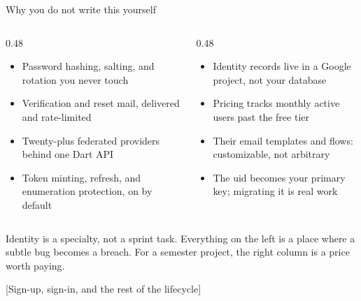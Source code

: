 \documentclass[10pt,aspectratio=169,t]{beamer}
\begin{document}
\begin{frame}[eyebrow=Fundamentals]{Why you do not write this yourself}
  \vskip 2mm
  \begin{columns}[T]
    \begin{column}{0.48\textwidth}
      \begin{itemize}
        \item Password hashing, salting, and rotation you never touch
        \item Verification and reset mail, delivered and rate-limited
        \item Twenty-plus federated providers behind one Dart API
        \item Token minting, refresh, and enumeration protection, on by default
      \end{itemize}
    \end{column}
    \begin{column}{0.48\textwidth}
      \begin{itemize}
        \item Identity records live in a Google project, not your database
        \item Pricing tracks monthly active users past the free tier
        \item Their email templates and flows: customizable, not arbitrary
        \item The uid becomes your primary key; migrating it is real work
      \end{itemize}
    \end{column}
  \end{columns}
  \begin{takeaway}{Identity is a specialty, not a sprint task.}
    Everything on the left is a place where a subtle bug becomes a breach. For a semester project, the right column is a price worth paying.
  \end{takeaway}
\end{frame}

[Sign-up, sign-in, and the rest of the lifecycle]
\end{document}
